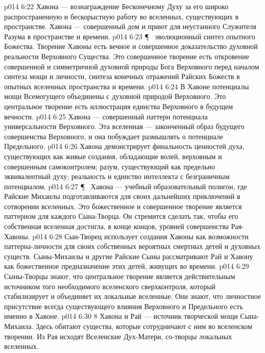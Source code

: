 \vs p014 6:22 Хавона --- вознаграждение Бесконечному Духу за его широко распространенную и бескорыстную работу во вселенных, существующих в пространстве. Хавона --- совершенный дом и приют для неустанного Служителя Разума в пространстве и времени.
\vs p014 6:23 \P\ \bibnobreakspace {} эволюционный синтез опытного Божества. Творение Хавоны есть вечное и совершенное доказательство духовной реальности Верховного Существа. Это совершенное творение есть откровение совершенной и симметричной духовной природы Бога Верховного перед началом синтеза мощи и личности, синтеза конечных отражений Райских Божеств в опытных вселенных пространства и времени.
\vs p014 6:24 В Хавоне потенциалы мощи Всемогущего объединены с духовной природой Верховного. Это центральное творение есть иллюстрация единства Верховного в будущем вечности.
\vs p014 6:25 Хавона --- совершенный паттерн потенциала универсальности Верховного. Эта вселенная --- законченный образ будущего совершенства Верховного, и она побуждает размышлять о потенциале Предельного.
\vs p014 6:26 Хавона демонстрирует финальность ценностей духа, существующих как живые создания, обладающие волей, верховным и совершенным самоконтролем; разум, существующий как предельно эквивалентный духу; реальность и единство интеллекта с безграничным потенциалом.
\vs p014 6:27 \P\ \bibnobreakspace {} Хавона --- учебный образовательный полигон, где Райские Михаилы подготавливаются для своих дальнейших приключений в сотворении вселенных. Это божественное и совершенное творение является паттерном для каждого Сына\hyp{}Творца. Он стремится сделать так, чтобы его собственная вселенная достигла, в конце концов, уровней совершенства Рая\hyp{}Хавоны.
\vs p014 6:28 Сын\hyp{}Творец использует создания Хавоны как возможности паттерна\hyp{}личности для своих собственных вероятных смертных детей и духовных существ. Сыны\hyp{}Михаилы и другие Райские Сыны рассматривают Рай и Хавону как божественное предназначение этих детей, живущих во времени.
\vs p014 6:29 Сыны\hyp{}Творцы знают, что центральное творение является действительным источником того необходимого вселенского сверхконтроля, который стабилизирует и объединяет их локальные вселенные. Они знают, что личностное присутствие всегда существующего влияния Верховного и Предельного есть именно в Хавоне.
\vs p014 6:30 8 Хавона и Рай --- источник творческой мощи Сына\hyp{}Михаила. Здесь обитают существа, которые сотрудничают с ним во вселенском творении. Из Рая исходят Вселенские Дух\hyp{}Матери, со\hyp{}творцы локальных вселенных.
